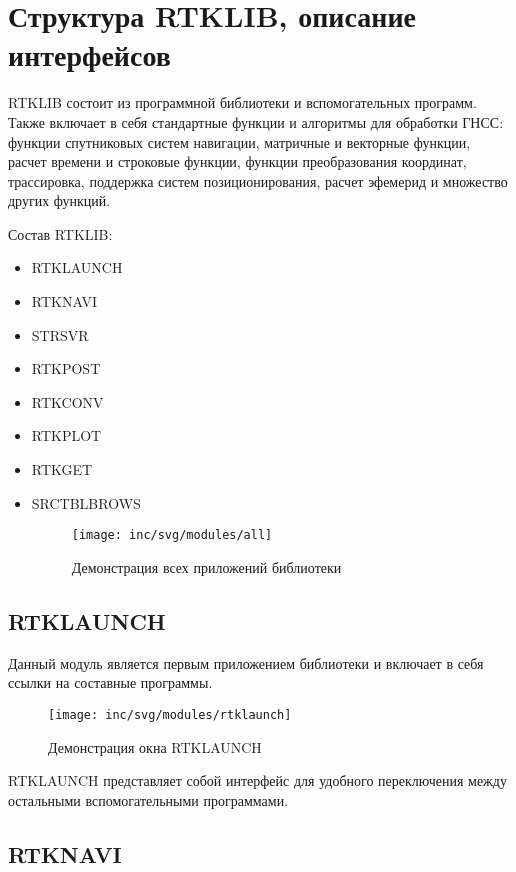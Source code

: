 \chapter{Структура RTKLIB, описание интерфейсов}
\label{cha:analysis}

RTKLIB состоит из программной библиотеки и
вспомогательных программ. Также включает в себя стандартные функции и алгоритмы для обработки ГНСС: функции спутниковых систем навигации, матричные и векторные функции, расчет времени и строковые функции, функции преобразования координат, трассировка, поддержка систем позиционирования, расчет эфемерид и множество других функций.

Состав RTKLIB:
\begin{itemize}
	\item RTKLAUNCH
	\item RTKNAVI
	\item STRSVR
	\item RTKPOST
	
	\item RTKCONV
	\item RTKPLOT
	\item RTKGET
	\item SRCTBLBROWS
	\begin{figure}[ht]
		\centering
		\texttt{[image: inc/svg/modules/all]}
		\caption{Демонстрация всех приложений библиотеки}
		\label{fig:all}
	\end{figure}
\end{itemize}



\section{RTKLAUNCH}
Данный модуль является первым приложением библиотеки и включает в себя ссылки на составные программы.

\begin{figure}[ht]
	\centering
	\texttt{[image: inc/svg/modules/rtklaunch]}
	\caption{Демонстрация окна RTKLAUNCH}
	\label{fig:rtklaunch}
\end{figure}

RTKLAUNCH представляет собой интерфейс для удобного переключения между остальными вспомогательными программами.


\section{RTKNAVI}

